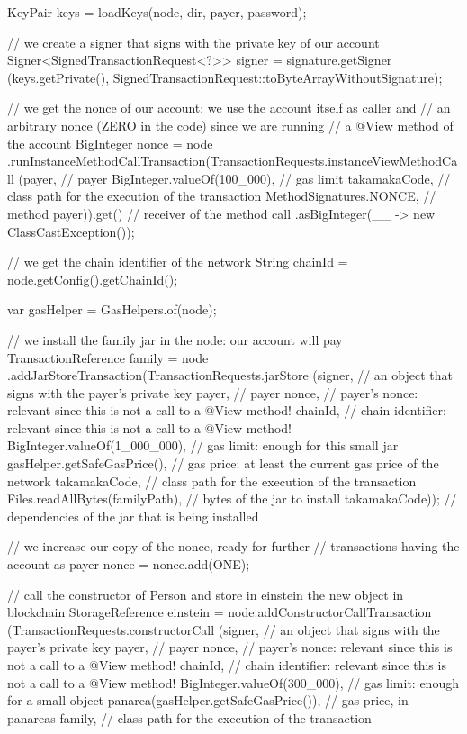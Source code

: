 \begin{codebox}
\begin{javalst}
{{{      KeyPair keys = loadKeys(node, dir, payer, password);

      // we create a signer that signs with the private key of our account
      Signer<SignedTransactionRequest<?>> signer = signature.getSigner
      (keys.getPrivate(), SignedTransactionRequest::toByteArrayWithoutSignature);

      // we get the nonce of our account: we use the account itself as caller and
      // an arbitrary nonce (ZERO in the code) since we are running
      // a @View method of the account
      BigInteger nonce = node
      .runInstanceMethodCallTransaction(TransactionRequests.instanceViewMethodCall
      (payer, // payer
      BigInteger.valueOf(100_000), // gas limit
      takamakaCode, // class path for the execution of the transaction
      MethodSignatures.NONCE, // method
      payer)).get() // receiver of the method call
      .asBigInteger(__ -> new ClassCastException());

      // we get the chain identifier of the network
      String chainId = node.getConfig().getChainId();

      var gasHelper = GasHelpers.of(node);

      // we install the family jar in the node: our account will pay
      TransactionReference family = node
      .addJarStoreTransaction(TransactionRequests.jarStore
      (signer, // an object that signs with the payer's private key
      payer, // payer
      nonce, // payer's nonce: relevant since this is not a call to a @View method!
      chainId, // chain identifier: relevant since this is not a call to a @View method!
      BigInteger.valueOf(1_000_000), // gas limit: enough for this small jar
      gasHelper.getSafeGasPrice(), // gas price: at least the current gas price of the network
      takamakaCode, // class path for the execution of the transaction
      Files.readAllBytes(familyPath), // bytes of the jar to install
      takamakaCode)); // dependencies of the jar that is being installed
      
      // we increase our copy of the nonce, ready for further
      // transactions having the account as payer
      nonce = nonce.add(ONE);

      // call the constructor of Person and store in einstein the new object in blockchain
      StorageReference einstein = node.addConstructorCallTransaction
      (TransactionRequests.constructorCall
      (signer, // an object that signs with the payer's private key
      payer, // payer
      nonce, // payer's nonce: relevant since this is not a call to a @View method!
      chainId, // chain identifier: relevant since this is not a call to a @View method!
      BigInteger.valueOf(300_000), // gas limit: enough for a small object
      panarea(gasHelper.getSafeGasPrice()), // gas price, in panareas
      family, // class path for the execution of the transaction
      
}}}
\end{javalst}
\end{codebox}
